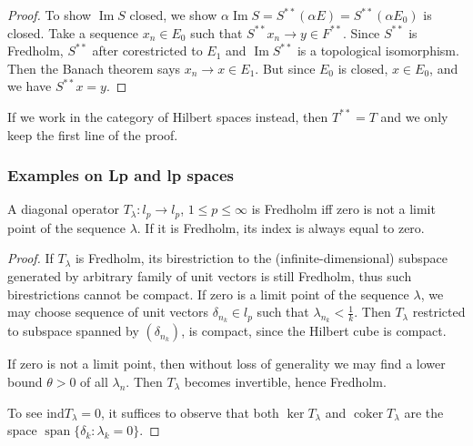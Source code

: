 \begin{proof}
To show  $\operatorname{Im} S$ closed, we show $\alpha \operatorname{Im} S = S^{* *} ( \alpha E) = S^{* *}(\alpha E_0)$ is closed. Take a sequence $x_n \in E_0$ such that $S^{* *} x_n \to y \in F^{* *}$. Since $S^{* *}$ is Fredholm, $S^{* *}$ after corestricted to $E_1$ and $\operatorname{Im} S^{* *}$ is a topological isomorphism.
Then the Banach theorem says $x_n \to x \in E_1$. But  since $E_0$ is closed, $x \in E_0$, and we have $S^{* *} x = y$.


	
\end{proof}

\begin{remark}
	If we work in the category of Hilbert spaces instead, then $T^{* *} = T$ and we only keep the first line of the proof.
\end{remark}


\subsubsection{Examples on Lp and lp spaces}

\begin{proposition}
	A diagonal operator $T_\lambda : l_p \to l_p$, $1 \le p \le \infty $ is Fredholm iff zero is not a limit point of the sequence $\lambda$. If it is Fredholm, its index is always equal to zero.
\end{proposition}
\begin{proof}
	If $T_\lambda$ is Fredholm, its birestriction to the (infinite-dimensional) subspace generated by arbitrary family of unit vectors is still Fredholm, thus such birestrictions cannot be compact. If zero is a limit point of the sequence $\lambda$, we may choose sequence of unit vectors $\delta_{n_k} \in l_p$ such that $\lambda_{n_k} < \frac{1}{k}$. Then $T_\lambda$ restricted to subspace spanned by $(\delta_{n_k})$, is compact, since the Hilbert cube is compact.

	If zero is not a limit point, then without loss of generality we may find a lower bound $\theta>0$ of all $\lambda_n$. Then $T_\lambda$ becomes invertible, hence Fredholm.

To see $\text{ind} T_\lambda = 0$, it suffices to observe that both $\operatorname{ker} T_\lambda$ and $\operatorname{coker} T_\lambda$ are the space $\operatorname{span } \{\delta_k : \lambda_k = 0\}$.
\end{proof}

